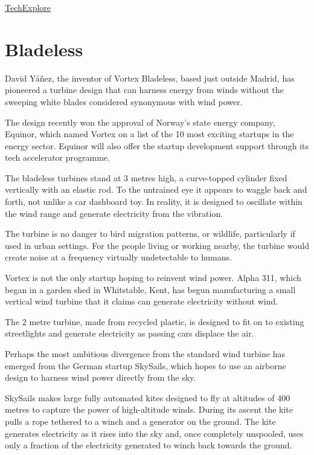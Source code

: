 \documentclass[
]{book}
\begin{document}
\href{https://techxplore.com/news/2021-03-field-icing-turbines-power-production.html}{TechExplore}

\hypertarget{bladeless}{%
\section{Bladeless}\label{bladeless}}

David Yáñez, the inventor of Vortex Bladeless, based just outside Madrid,
has pioneered a turbine design that can harness energy from winds
without the sweeping white blades considered synonymous with wind power.

The design recently won the approval of Norway's state energy company, Equinor,
which named Vortex on a list of the 10 most exciting startups in the energy sector.
Equinor will also offer the startup development support through its tech accelerator programme.

The bladeless turbines stand at 3 metres high,
a curve-topped cylinder fixed vertically with an elastic rod.
To the untrained eye it appears to waggle back and forth,
not unlike a car dashboard toy.
In reality, it is designed to oscillate within the wind range and
generate electricity from the vibration.

The turbine is no danger to bird migration patterns, or wildlife, particularly if used in urban settings. For the people living or working nearby, the turbine would create noise at a frequency virtually undetectable to humans.

Vortex is not the only startup hoping to reinvent wind power. Alpha 311, which began in a garden shed in Whitstable, Kent, has begun manufacturing a small vertical wind turbine that it claims can generate electricity without wind.

The 2 metre turbine, made from recycled plastic, is designed to fit on to existing streetlights and generate electricity as passing cars displace the air.

Perhaps the most ambitious divergence from the standard wind turbine has emerged from the German startup SkySails, which hopes to use an airborne design to harness wind power directly from the sky.

SkySails makes large fully automated kites designed to fly at altitudes of 400 metres to capture the power of high-altitude winds. During its ascent the kite pulls a rope tethered to a winch and a generator on the ground. The kite generates electricity as it rises into the sky and, once completely unspooled, uses only a fraction of the electricity generated to winch back towards the ground.
\end{document}
